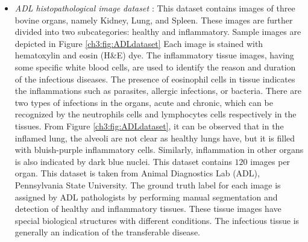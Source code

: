 \begin{itemize}
\item \emph{ADL histopathological image dataset \cite{srinivas2014}}: This dataset contains images of three bovine organs, namely Kidney, Lung, and Spleen. These images are further divided into two subcategories: healthy and inflammatory. Sample images are depicted in Figure \ref{ch3:fig:ADLdataset} Each image is stained with hematoxylin and eosin (H\&E) dye. The inflammatory tissue images, having some specific white blood cells, are used to identify the reason and duration of the infectious diseases. The presence of eosinophil cells in tissue indicates the inflammations such as parasites, allergic infections, or bacteria.  There are two types of infections in the organs, acute and chronic, which can be recognized by the neutrophils cells and lymphocytes cells respectively in the tissues. From Figure \ref{ch3:fig:ADLdataset}, it can be observed that in the inflamed lung, the alveoli are not clear as healthy lungs have, but it is filled with bluish-purple inflammatory cells. Similarly, inflammation in other organs is also indicated by dark blue nuclei. This dataset contains $120$ images per organ. This dataset is taken from Animal Diagnostics Lab (ADL), Pennsylvania State University.  The ground truth label for each image is assigned by ADL pathologists by performing manual segmentation and detection of healthy and inflammatory tissues. These tissue images have special biological structures with different conditions. The infectious tissue is generally an indication of the transferable disease.  
\begin{figure}[h]
\centering
         \hspace{2mm}
             \\
        \hspace{2mm} 

\end{figure}
\end{itemize}
